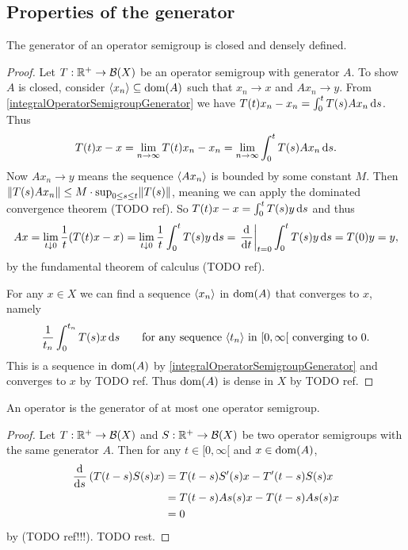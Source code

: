 \subsection{Properties of the generator}
\begin{proposition} \label{generatorClosedDenselyDefined}
The generator of an operator semigroup is closed and densely defined.
\end{proposition}
\begin{proof}
Let $T: \mathbb{R}^+\to \operatorname{\mathcal{B}}(X)$ be an operator semigroup with generator $A$. To show $A$ is closed, consider $\left\langle x_n \right\rangle\subseteq \operatorname{dom}(A)$ such that $x_n\to x$ and $Ax_n \to y$. From \ref{integralOperatorSemigroupGenerator} we have $T(t)x_n - x_n = \int_0^tT(s)Ax_n\operatorname{d \!}{s}$. Thus
\[ T(t)x-x = \lim_{n\to\infty} T(t)x_n - x_n = \lim_{n\to\infty} \int_0^tT(s)Ax_n\operatorname{d \!}{s}. \]
Now $Ax_n \to y$ means the sequence $\left\langle Ax_n \right\rangle$ is bounded by some constant $M$. Then $\lVert T(s)Ax_n\rVert \leq M\cdot\sup_{0\leq s \leq t}\lVert T(s)\rVert$, meaning we can apply the dominated convergence theorem (TODO ref). So $T(t)x-x = \int_0^tT(s)y\operatorname{d \!}{s}$ and thus
\[ Ax = \lim_{t\downarrow 0}\frac{1}{t}(T(t)x-x) = \lim_{t\downarrow 0}\frac{1}{t}\int_0^tT(s)y\operatorname{d \!}{s} = \left.\mathinner{ \dfrac{\operatorname{d \!}{^{}}}{\operatorname{d \!}{{t}^{}}} }\right|_{t=0}\int_0^tT(s)y\operatorname{d \!}{s} = T(0)y = y, \]
by the fundamental theorem of calculus (TODO ref).

For any $x\in X$ we can find a sequence $\left\langle x_n \right\rangle$ in $\operatorname{dom}(A)$ that converges to $x$, namely
\[ \frac{1}{t_n}\int^{t_n}_0T(s)x\operatorname{d \!}{s} \qquad \text{for any sequence $\left\langle t_n \right\rangle$ in $[0,\infty[$ converging to $0$.}  \]
This is a sequence in $\operatorname{dom}(A)$ by \ref{integralOperatorSemigroupGenerator} and converges to $x$ by TODO ref. Thus $\operatorname{dom}(A)$ is dense in $X$ by TODO ref.
\end{proof}

\begin{proposition} \label{generatorSemigroupUnique}
An operator is the generator of at most one operator semigroup.
\end{proposition}
\begin{proof}
Let $T: \mathbb{R}^+\to \operatorname{\mathcal{B}}(X)$ and $S: \mathbb{R}^+\to \operatorname{\mathcal{B}}(X)$ be two operator semigroups with the same generator $A$. Then for any $t\in [0,\infty[$ and $x\in \operatorname{dom}(A)$,
\begin{align*}
\mathinner{ \dfrac{\operatorname{d \!}{^{}}}{\operatorname{d \!}{{s}^{}}} } \left(T(t-s)S(s)x\right) &= T(t-s)S'(s)x - T'(t-s)S(s)x \\
&= T(t-s)As(s)x - T(t-s)As(s)x \\
&= 0
\end{align*}
by (TODO ref!!!). TODO rest.
\end{proof}

